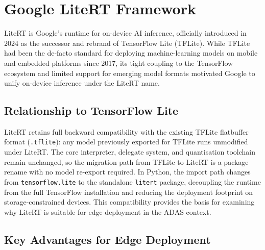 \section{Google LiteRT Framework}
\label{sec:litert}

LiteRT is Google's runtime for on-device AI inference, officially introduced in 2024 as the successor and rebrand of TensorFlow Lite (TFLite).  While TFLite had been the de-facto standard for deploying machine-learning models on mobile and embedded platforms since 2017, its tight coupling to the TensorFlow ecosystem and limited support for emerging model formats motivated Google to unify on-device inference under the LiteRT name.

\subsection{Relationship to TensorFlow Lite}

LiteRT retains full backward compatibility with the existing TFLite flatbuffer format (\texttt{.tflite}): any model previously exported for TFLite runs unmodified under LiteRT.  The core interpreter, delegate system, and quantisation toolchain remain unchanged, so the migration path from TFLite to LiteRT is a package rename with no model re-export required.  In Python, the import path changes from \texttt{tensorflow.lite} to the standalone \texttt{litert} package, decoupling the runtime from the full TensorFlow installation and reducing the deployment footprint on storage-constrained devices.  This compatibility provides the basis for examining why LiteRT is suitable for edge deployment in the ADAS context.

\subsection{Key Advantages for Edge Deployment}



